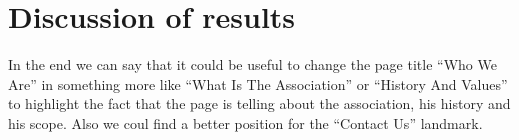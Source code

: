 %
%
\chapter{Discussion of results}
In the end we can say that it could be useful to change the page title ``Who We Are'' in something more like ``What Is The Association'' or ``History And Values'' to highlight the fact that the page is telling about the association, his history and his scope. Also we coul find a better position for the ``Contact Us'' landmark.
%

